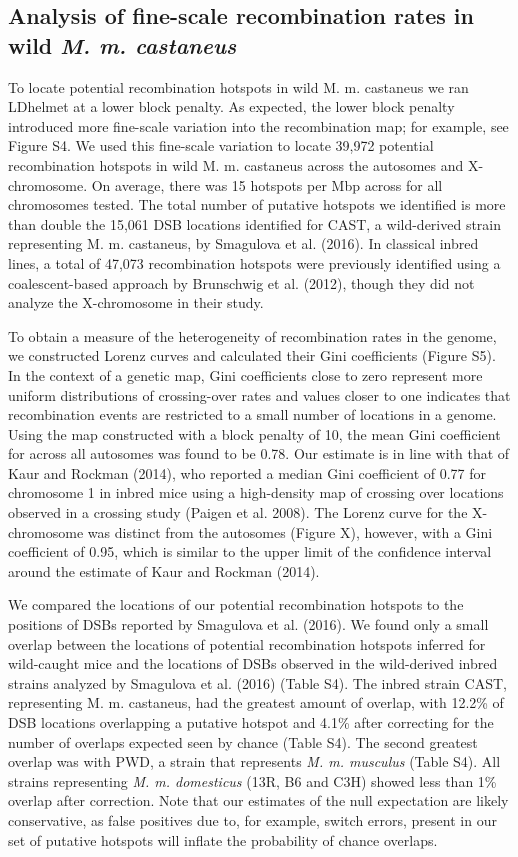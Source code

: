 \subsection{Analysis of fine-scale recombination rates in wild \emph{M. m. castaneus}}


To locate potential recombination hotspots in wild M. m. castaneus we ran LDhelmet at a lower block penalty. As expected, the lower block penalty introduced more fine-scale variation into the recombination map; for example, see Figure S4. We used this fine-scale variation to locate 39,972 potential recombination hotspots in wild M. m. castaneus across the autosomes and X-chromosome. On average, there was 15 hotspots per Mbp across for all chromosomes tested. The total number of putative hotspots we identified is more than double the 15,061 DSB locations identified for CAST, a wild-derived strain representing M. m. castaneus, by Smagulova et al. (2016). In classical inbred lines, a total of 47,073 recombination hotspots were previously identified using a coalescent-based approach by Brunschwig et al. (2012), though they did not analyze the X-chromosome in their study. 

To obtain a measure of the heterogeneity of recombination rates in the genome, we constructed Lorenz curves and calculated their Gini coefficients (Figure S5). In the context of a genetic map, Gini coefficients close to zero represent more uniform distributions of crossing-over rates and values closer to one indicates that recombination events are restricted to a small number of locations in a genome. Using the map constructed with a block penalty of 10, the mean Gini coefficient for across all autosomes was found to be 0.78. Our estimate is in line with that of Kaur and Rockman (2014), who reported a median Gini coefficient of 0.77 for chromosome 1 in inbred mice using a high-density map of crossing over locations observed in a crossing study (Paigen et al. 2008). The Lorenz curve for the X-chromosome was distinct from the autosomes (Figure X), however, with a Gini coefficient of 0.95, which is similar to the upper limit of the confidence interval around the estimate of Kaur and Rockman (2014). 

We compared the locations of our potential recombination hotspots to the positions of DSBs reported by Smagulova et al. (2016). We found only a small overlap between the locations of potential recombination hotspots inferred for wild-caught mice and the locations of DSBs observed in the wild-derived inbred strains analyzed by Smagulova et al. (2016) (Table S4). The inbred strain CAST, representing M. m. castaneus, had the greatest amount of overlap, with 12.2\% of DSB locations overlapping a putative hotspot and 4.1\% after correcting for the number of overlaps expected seen by chance (Table S4). The second greatest overlap was with PWD, a strain that represents \emph{M. m. musculus} (Table S4). All strains representing \emph{M. m. domesticus} (13R, B6 and C3H) showed less than 1\% overlap after correction. Note that our estimates of the null expectation are likely conservative, as false positives due to, for example, switch errors, present in our set of putative hotspots will inflate the probability of chance overlaps. 

